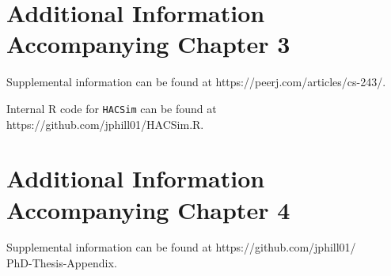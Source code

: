 \linespread{1.0}


\appendix

\chapter{Additional Information Accompanying Chapter 3}

Supplemental information can be found at https://peerj.com/articles/cs-243/. 

Internal R code for {\tt HACSim} can be found at https://github.com/jphill01/HACSim.R.


\chapter{Additional Information Accompanying Chapter 4}

Supplemental information can be found at https://github.com/jphill01/\\PhD-Thesis-Appendix.



